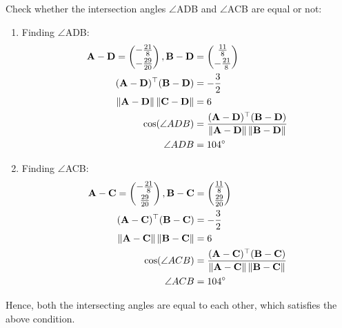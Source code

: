\documentclass[12pt]{article}
\providecommand{\norm}[1]{\left\lVert#1\right\rVert}
\newcommand{\myvec}[1]{\ensuremath{\begin{pmatrix}#1\end{pmatrix}}}
\let\vec\mathbf
\let\vec\mathbf
\providecommand{\norm}[1]{\left\lVert#1\right\rVert}
\let\vec\mathbf
\begin{document}
Check whether the intersection angles $\angle$ADB and $\angle$ACB are equal or not:
\begin{enumerate}
\item Finding $\angle$ADB:
	\begin{align}
		 \vec{A-D} = \myvec{-\frac{21}{8}\\[2pt]-\frac{29}{20}},
		\vec{B-D}& = \myvec{\frac{11}{8}\\[2pt]-\frac{21}{8}}\\
	 \vec{(A-D)^\top(B-D)}&= -\frac{3}{2}\\
	 \norm{\vec{A-D}}\norm{\vec{C-D}}& = 6\\
		\cos(\angle ADB)& = \frac{\vec{(A-D)^\top(B-D)}}{\norm{\vec{A-D}}\norm{\vec{B-D}}}\\
		\angle ADB&=104\degree
\end{align}
\item Finding $\angle$ACB:
\begin{align}
	\vec{A-C} = \myvec{-\frac{21}{8}\\[2pt]\frac{29}{20}},
	 \vec{B-C}& = \myvec{\frac{11}{8}\\[2pt]\frac{29}{20}}\\
	 \vec{(A-C)^\top(B-C)}&= -\frac{3}{2}\\
	 \norm{\vec{A-C}}\norm{\vec{B-C}}& = 6\\
	 \cos(\angle ACB) &= \frac{\vec{(A-C)^\top(B-C)}}{\norm{\vec{A-C}}\norm{\vec{B-C}}}\\
	 \angle ACB&=104\degree
\end{align}
\end{enumerate}
Hence, both the intersecting angles are equal to each other, which satisfies the above condition.
\end{document}
